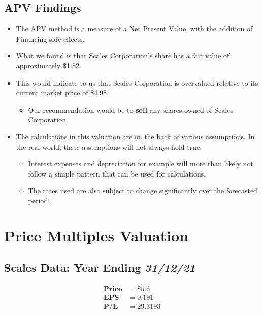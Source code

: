 \documentclass{article}
\begin{document}
\subsection{APV Findings}

\begin{itemize}
    \item The APV method is a measure of a Net Present Value, with the addition of Financing side effects. 
    \item What we found is that Scales Corporation’s share has a fair value of approximately \$1.82. 
    \item This would indicate to us that Scales Corporation is overvalued relative to its current market price of \$4.98.  
    \begin{itemize}
        \item Our recommendation would be to \textbf{sell} any shares owned of Scales Corporation.
    \end{itemize}
    \item The calculations in this valuation are on the back of various assumptions. In the real world, these assumptions will not always hold true: 
    \begin{itemize}
        \item Interest expenses and depreciation for example will more than likely not follow a simple pattern that can be used for calculations.
        \item The rates used are also subject to change significantly over the forecasted period. 
    \end{itemize}  
\end{itemize}

\newpage
\section{Price Multiples Valuation}
\subsection{Scales Data: Year Ending \textit{31/12/21}}
\begin{equation*}
\begin{split}
\textbf{Price} &= \$5.6 \\
\textbf{EPS}   &= 0.191 \\
\textbf{P/E}   &= 29.3193 \\
\end{split}
\end{equation*}
\end{document}
